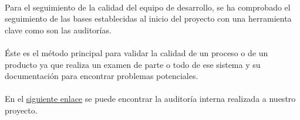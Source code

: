 \newcommand{\audiInterna}[2]{\href{run:xls/#1.xls}{#2}}
\paragraph{}Para el seguimiento de la calidad del equipo de desarrollo, se ha comprobado el seguimiento de las bases establecidas al inicio del proyecto con una herramienta clave como son las auditorías.
\paragraph{}Éste es el método principal para validar la calidad de un proceso o de un producto ya que realiza un examen de parte o todo de ese sistema y su documentación para encontrar problemas potenciales.

\paragraph{}En el \audiInterna{auditoria_interna}{siguiente enlace} se puede encontrar la auditoría interna realizada a nuestro proyecto.